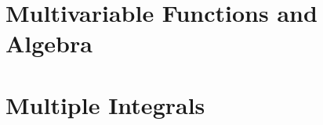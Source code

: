\documentclass{article}
\begin{document}
\section{Multivariable Functions and Algebra}

\newpage %

\newpage %

\newpage %

\newpage %


\section{Multiple Integrals}

\end{document}
